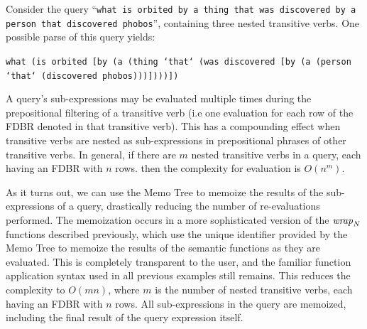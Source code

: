 \documentclass[../main.tex]{subfiles}
\begin{document}
\begin{refsection}
Consider the query ``\texttt{what is orbited by a thing that was discovered by a person that discovered phobos}'', containing three nested transitive verbs.
One possible parse of this query yields:
\begin{center}
	\texttt{what (is orbited [by (a (thing `that` (was discovered [by (a (person `that` (discovered phobos)))])))])}
\end{center}
A query's sub-expressions may be evaluated multiple times during the prepositional filtering of a transitive verb (i.e one evaluation for each row of the FDBR denoted in that transitive verb).  This has a compounding effect when transitive verbs are nested as sub-expressions in prepositional phrases of other transitive verbs. In general, if there are $m$ nested transitive verbs in a query, each having an FDBR with $n$ rows. then the complexity for evaluation is $O(n^m)$.

As it turns out, we can use the Memo Tree to memoize the results of the sub-expressions of a query, drastically reducing the number of re-evaluations performed.  The memoization occurs in a more sophisticated version of the $\operatorname{\mathit{wrap}}_N$ functions described previously, which use the unique identifier provided by the Memo Tree to memoize the results of the semantic functions as they are evaluated. This is completely transparent to the user, and the familiar function application syntax used in all previous examples still remains. This reduces the complexity to $O(mn)$, where $m$ is the number of nested transitive verbs, each having an FDBR with $n$ rows. All sub-expressions in the query are memoized, including the final result of the query expression itself.


\end{refsection}
\end{document}
